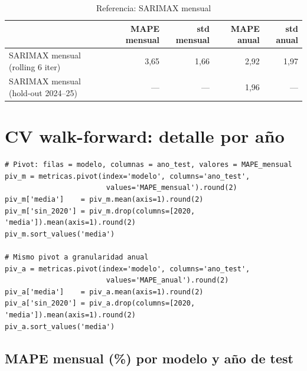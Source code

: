 \documentclass[12pt,a4paper]{article}
\begin{document}
\begin{table}[H]
\centering
\caption{Referencia: SARIMAX mensual}
\begin{tabular}{lrrrr}
\toprule
& MAPE mensual & std mensual & MAPE anual & std anual \\
\midrule
SARIMAX mensual (rolling 6 iter)     & 3{,}65 & 1{,}66 & 2{,}92 & 1{,}97 \\
SARIMAX mensual (hold-out 2024--25)  & ---    & ---    & 1{,}96 & ---    \\
\bottomrule
\end{tabular}
\end{table}

\section{CV walk-forward: detalle por año}
\label{sec:cv}

\begin{lstlisting}[caption={Pivot de MAPE mensual y anual por modelo y año}]
# Pivot: filas = modelo, columnas = ano_test, valores = MAPE_mensual
piv_m = metricas.pivot(index='modelo', columns='ano_test',
                        values='MAPE_mensual').round(2)
piv_m['media']    = piv_m.mean(axis=1).round(2)
piv_m['sin_2020'] = piv_m.drop(columns=[2020, 'media']).mean(axis=1).round(2)
piv_m.sort_values('media')

# Mismo pivot a granularidad anual
piv_a = metricas.pivot(index='modelo', columns='ano_test',
                        values='MAPE_anual').round(2)
piv_a['media']    = piv_a.mean(axis=1).round(2)
piv_a['sin_2020'] = piv_a.drop(columns=[2020, 'media']).mean(axis=1).round(2)
piv_a.sort_values('media')
\end{lstlisting}

\subsection*{MAPE mensual (\%) por modelo y año de test}
\end{document}
